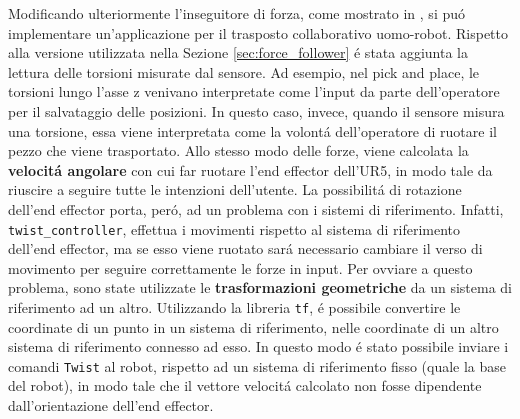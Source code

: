 Modificando ulteriormente l'inseguitore di forza, come mostrato in \cite{full_force_follower}, si pu\'{o} implementare un'applicazione 
per il trasposto collaborativo uomo-robot. Rispetto alla versione utilizzata nella Sezione \ref{sec:force_follower} \'{e} stata aggiunta 
la lettura delle torsioni misurate dal sensore. 
Ad esempio, nel pick and place, le torsioni lungo l'asse z venivano interpretate come l'input da parte dell'operatore per il salvataggio 
delle posizioni. In questo caso, invece, quando il sensore misura una torsione, essa viene interpretata come la volont\'{a} 
dell'operatore di ruotare il pezzo che viene trasportato.
Allo stesso modo delle forze, viene calcolata la \textbf{velocit\'{a} angolare} 
con cui far ruotare l'end effector dell'UR5, in modo tale da riuscire a seguire tutte le intenzioni dell'utente. 
La possibilit\'{a} di rotazione dell'end effector porta, per\'{o}, ad un problema con i sistemi di riferimento. 
Infatti, \verb|twist_controller|, effettua i movimenti rispetto al sistema di riferimento dell'end effector, ma se esso viene ruotato 
sar\'{a} necessario cambiare il verso di movimento per seguire correttamente le forze in input. Per ovviare a questo 
problema, sono state utilizzate le \textbf{trasformazioni geometriche} da un sistema di riferimento ad un altro. 
Utilizzando la libreria \verb|tf|, \'{e} possibile convertire le coordinate di un punto in un sistema di riferimento, nelle 
coordinate di un altro sistema di riferimento connesso ad esso. In questo modo \'{e} stato possibile inviare i comandi 
\verb|Twist| al robot, rispetto ad un sistema di riferimento fisso (quale la base del robot), in modo tale che il vettore velocit\'{a} 
calcolato non fosse dipendente dall'orientazione dell'end effector. 
